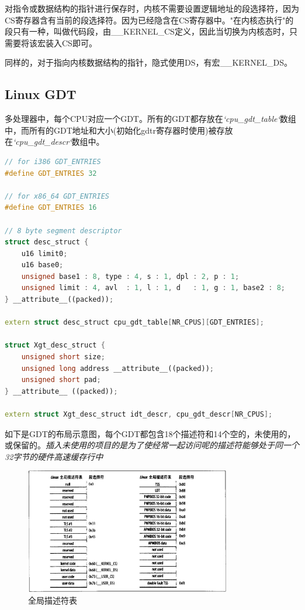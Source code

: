     对指令或数据结构的指针进行保存时，内核不需要设置逻辑地址的段选择符，因为CS寄存器含有当前的段选择符。因为已经隐含在CS寄存器中。"在内核态执行"的段只有一种，叫做代码段，由\_\_KERNEL\_CS定义，因此当切换为内核态时，只需要将该宏装入CS即可。

    同样的，对于指向内核数据结构的指针，隐式使用DS，有宏\_\_KERNEL\_DS。

\subsection{Linux GDT}

    多处理器中，每个CPU对应一个GDT。所有的GDT都存放在\emph{`cpu\_gdt\_table`}数组中，而所有的GDT地址和大小(初始化gdtr寄存器时使用)被存放在\emph{`cpu\_gdt\_descr`}数组中。

\begin{lstlisting}[language=C++]
// for i386 GDT_ENTRIES
#define GDT_ENTRIES 32 

// for x86_64 GDT_ENTRIES
#define GDT_ENTRIES 16

// 8 byte segment descriptor
struct desc_struct { 
	u16 limit0;
	u16 base0;
	unsigned base1 : 8, type : 4, s : 1, dpl : 2, p : 1;
	unsigned limit : 4, avl  : 1, l : 1, d   : 1, g : 1, base2 : 8;
} __attribute__((packed)); 

extern struct desc_struct cpu_gdt_table[NR_CPUS][GDT_ENTRIES];

struct Xgt_desc_struct {
	unsigned short size;
	unsigned long address __attribute__((packed));
	unsigned short pad;
} __attribute__ ((packed));

extern struct Xgt_desc_struct idt_descr, cpu_gdt_descr[NR_CPUS];
\end{lstlisting}

    如下是GDT的布局示意图，每个GDT都包含18个描述符和14个空的，未使用的，或保留的。\emph{插入未使用的项目的是为了使经常一起访问呢的描述符能够处于同一个32字节的硬件高速缓存行中}

\begin{figure}[!htbp]
    \centering
    \includegraphics[width=0.8\textwidth]{image/chapter02/全局描述符表.png}
    \caption{全局描述符表}
\end{figure}

